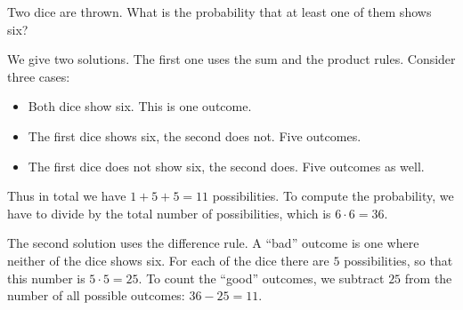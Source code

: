 

\setcounter{section}{1}
\setcounter{subsection}{3}
\setcounter{dfn}{3}

\begin{exl}
Two dice are thrown. What is the probability that at least one of them shows six?

We give two solutions.
The first one uses the sum and the product rules.
Consider three cases:
\begin{itemize}
\item
Both dice show six. This is one outcome.
\item
The first dice shows six, the second does not. Five outcomes.
\item
The first dice does not show six, the second does. Five outcomes as well.
\end{itemize}
Thus in total we have $1+5+5=11$ possibilities.
To compute the probability, we have to divide by the total number of possibilities, which is $6 \cdot 6 = 36$.

The second solution uses the difference rule.
A ``bad'' outcome is one where neither of the dice shows six.
For each of the dice there are $5$ possibilities, so that this number is $5 \cdot 5 = 25$.
To count the ``good'' outcomes, we subtract $25$ from the number of all possible outcomes:
$36-25=11$.
\end{exl}


